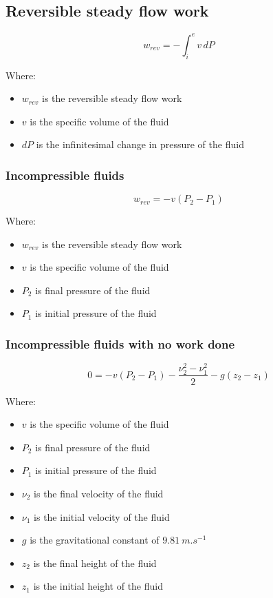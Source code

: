 \documentclass[11pt]{article}
\begin{document}
\subsection{Reversible steady flow work}
\label{sec:orgcbc1924}
\[w_{rev} = - \int_i^e v \, dP\]

Where:
\begin{itemize}
\item \(w_{rev}\) is the reversible steady flow work
\item \(v\) is the specific volume of the fluid
\item \(dP\) is the infinitesimal change in pressure of the fluid
\end{itemize}
\subsubsection{Incompressible fluids}
\label{sec:orge8eae9c}
\[w_{rev} = -v (P_2 - P_1)\]

Where:
\begin{itemize}
\item \(w_{rev}\) is the reversible steady flow work
\item \(v\) is the specific volume of the fluid
\item \(P_2\) is final pressure of the fluid
\item \(P_1\) is initial pressure of the fluid
\end{itemize}
\subsubsection{Incompressible fluids with no work done}
\label{sec:org1df875c}
\[0 = -v (P_2 - P_1) - \frac{\nu_2^2 - \nu_1^2}{2} - g(z_2 - z_1)\]

Where:
\begin{itemize}
\item \(v\) is the specific volume of the fluid
\item \(P_2\) is final pressure of the fluid
\item \(P_1\) is initial pressure of the fluid
\item \(\nu_2\) is the final velocity of the fluid
\item \(\nu_1\) is the initial velocity of the fluid
\item \(g\) is the gravitational constant of \(\qty{9.81}{m.s^{-1}}\)
\item \(z_2\) is the final height of the fluid
\item \(z_1\) is the initial height of the fluid
\end{itemize}
\end{document}
